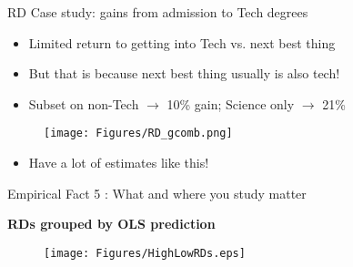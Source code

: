 \documentclass[table,10pt]{beamer}
\begin{document}
\begin{frame}{RD Case study: gains from admission to Tech degrees}
\begin{itemize}
\item Limited return to getting into Tech vs. next best thing
\item But that is because next best thing usually is also tech!
\item Subset on non-Tech $\rightarrow$ 10\% gain; Science only $\rightarrow$ 21\%
\end{itemize}
\centering
\begin{center}
\begin{minipage}[f]{\textwidth}
\begin{figure}[H]
 \centering
\vspace{-.1in}
\texttt{[image: Figures/RD\_gcomb.png]}
\end{figure}
\end{minipage}
\end{center}
\begin{itemize}
\item<2> Have a lot of estimates like this!
\end{itemize}
\end{frame}



\begin{frame}{Empirical Fact 5 : What and where you study matter}

\textbf{RDs grouped by OLS prediction}
\begin{center}
\begin{figure}[H]
\texttt{[image: Figures/HighLowRDs.eps]}
\end{figure}
\end{center}
\end{frame}
\end{document}
